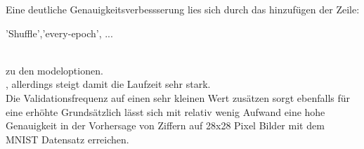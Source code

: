 \documentclass[8pt,a4paper]{article}
\begin{document}
Eine deutliche Genauigkeitsverbessserung lies sich durch das hinzufügen der Zeile:\\

\begin{listing}
'Shuffle','every-epoch', ...
\end{listing}
\\
zu den modeloptionen.
\\  , allerdings steigt damit die Laufzeit sehr stark.\\
Die Validationsfrequenz auf einen sehr kleinen Wert zusätzen sorgt ebenfalls für eine erhöhte 
Grundsätzlich lässt sich mit relativ wenig Aufwand eine hohe Genauigkeit in der Vorhersage von Ziffern auf 28x28 Pixel Bilder mit dem MNIST Datensatz erreichen.\\
\end{document}
